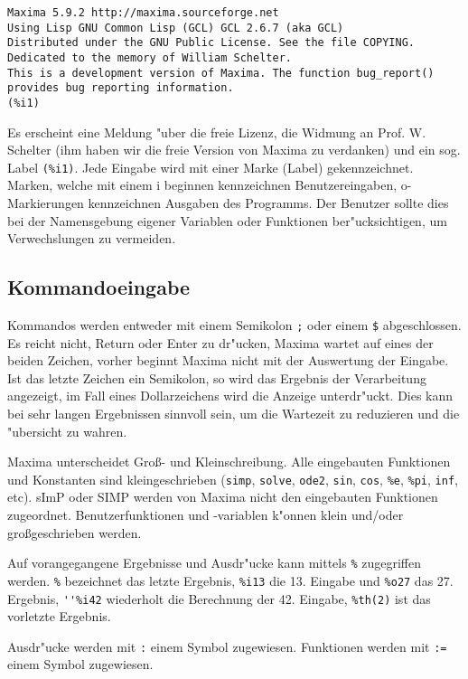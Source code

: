 \documentclass[ngerman,12pt,a4paper]{article}
\begin{document}
\scriptsize
\begin{verbatim}
Maxima 5.9.2 http://maxima.sourceforge.net
Using Lisp GNU Common Lisp (GCL) GCL 2.6.7 (aka GCL)
Distributed under the GNU Public License. See the file COPYING.
Dedicated to the memory of William Schelter.
This is a development version of Maxima. The function bug_report()
provides bug reporting information.
(%i1)
\end{verbatim}
\normalsize

Es erscheint eine Meldung "uber die freie Lizenz, die Widmung an Prof. W. Schelter (ihm haben wir die freie Version von Maxima zu verdanken) und ein sog. Label  \verb|(%i1)|. Jede Eingabe wird mit einer Marke (Label) gekennzeichnet. Marken, welche mit einem i beginnen kennzeichnen Benutzereingaben, o-Markierungen kennzeichnen Ausgaben des Programms. Der Benutzer sollte dies bei der Namensgebung eigener Variablen oder Funktionen ber"ucksichtigen, um Verwechslungen zu vermeiden.

\subsection{Kommandoeingabe}

Kommandos werden entweder mit einem Semikolon  \verb|;|  oder einem  \verb|$| abgeschlossen. Es reicht nicht, Return oder Enter zu dr"ucken, Maxima wartet auf eines der beiden Zeichen, vorher beginnt Maxima nicht mit der Auswertung der Eingabe. Ist das letzte Zeichen ein Semikolon, so wird das Ergebnis der Verarbeitung angezeigt, im Fall eines Dollarzeichens wird die Anzeige unterdr"uckt. Dies kann bei sehr langen Ergebnissen sinnvoll sein, um die Wartezeit zu reduzieren und die "ubersicht zu wahren.

Maxima unterscheidet Gro{\ss}- und Kleinschreibung. Alle eingebauten Funktionen und Konstanten sind kleingeschrieben (\verb|simp|, \verb|solve|, \verb|ode2|, \verb|sin|, \verb|cos|, \verb|%e|, \verb|%pi|, \verb|inf|, etc). sImP oder SIMP werden von Maxima nicht den eingebauten Funktionen zugeordnet. Benutzerfunktionen und -variablen k"onnen klein und/oder gro{\ss}geschrieben werden.

Auf vorangegangene Ergebnisse und Ausdr"ucke kann mittels \verb|%| zugegriffen werden. \verb|%| bezeichnet das letzte Ergebnis, \verb|%i13| die 13. Eingabe und \verb|%o27| das 27. Ergebnis, \verb|''%i42| wiederholt die Berechnung der 42. Eingabe, \verb|%th(2)| ist das vorletzte Ergebnis.

Ausdr"ucke werden mit \verb|:| einem Symbol zugewiesen. Funktionen werden mit \verb|:=| einem Symbol zugewiesen.
\end{document}
